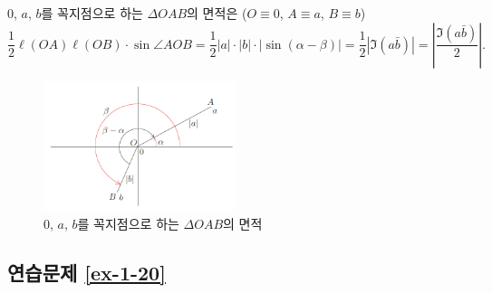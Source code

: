 $0$, $a$, $b$를 꼭지점으로 하는 $\Delta OAB$의 면적은
($O\equiv 0$, $A\equiv a$, $B\equiv b$)
\[
\dfrac12 \ell(OA)\ell(OB) \cdot \sin \angle AOB
= \dfrac12 |a|\cdot |b| \cdot |\sin(\alpha-\beta)|
= \dfrac12 |\Im(a\bar b)| = \left| \dfrac{\Im(a\bar b)}2\right|.
\]

\begin{figure}[h!]
\begin{center}
\includegraphics[width=0.5\textwidth]{./Solution/figs/fig-5-6}
\end{center}
\caption{$0$, $a$, $b$를 꼭지점으로 하는 $\Delta OAB$의 면적}
\label{fig-5-6}
\end{figure}

\subsection*{연습문제 \ref{ex-1-20}}

